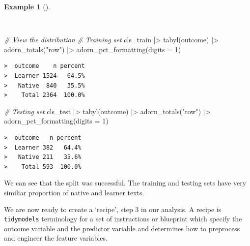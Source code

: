 \documentclass[
  letterpaper,
]{latex/krantz}
\newenvironment{Shaded}{\begin{snugshade}}{\end{snugshade}}
\newcommand{\AttributeTok}[1]{\textcolor[rgb]{0.00,0.00,0.00}{#1}}
\newcommand{\CommentTok}[1]{\textcolor[rgb]{0.00,0.00,0.00}{\textit{#1}}}
\newcommand{\DecValTok}[1]{\textcolor[rgb]{0.00,0.00,0.00}{#1}}
\newcommand{\FunctionTok}[1]{\textcolor[rgb]{0.00,0.00,0.00}{#1}}
\newcommand{\NormalTok}[1]{\textcolor[rgb]{0.00,0.00,0.00}{#1}}
\newcommand{\SpecialCharTok}[1]{\textcolor[rgb]{0.00,0.00,0.00}{#1}}
\newcommand{\StringTok}[1]{\textcolor[rgb]{0.00,0.00,0.00}{#1}}
\theoremstyle{definition}
\newtheorem{example}{Example}[chapter]
\theoremstyle{remark}
\begin{document}
\begin{example}[]\protect\hypertarget{exm-pda-class-split-tabyl}{}\label{exm-pda-class-split-tabyl}

~

\begin{Shaded}
\begin{Highlighting}[]
\CommentTok{\# View the distribution}
\CommentTok{\# Training set}
\NormalTok{cls\_train }\SpecialCharTok{|\textgreater{}}
  \FunctionTok{tabyl}\NormalTok{(outcome) }\SpecialCharTok{|\textgreater{}}
  \FunctionTok{adorn\_totals}\NormalTok{(}\StringTok{"row"}\NormalTok{) }\SpecialCharTok{|\textgreater{}}
  \FunctionTok{adorn\_pct\_formatting}\NormalTok{(}\AttributeTok{digits =} \DecValTok{1}\NormalTok{)}
\end{Highlighting}
\end{Shaded}

\begin{verbatim}
>  outcome    n percent
>  Learner 1524   64.5%
>   Native  840   35.5%
>    Total 2364  100.0%
\end{verbatim}

\begin{Shaded}
\begin{Highlighting}[]
\CommentTok{\# Testing set}
\NormalTok{cls\_test }\SpecialCharTok{|\textgreater{}}
  \FunctionTok{tabyl}\NormalTok{(outcome) }\SpecialCharTok{|\textgreater{}}
  \FunctionTok{adorn\_totals}\NormalTok{(}\StringTok{"row"}\NormalTok{) }\SpecialCharTok{|\textgreater{}}
  \FunctionTok{adorn\_pct\_formatting}\NormalTok{(}\AttributeTok{digits =} \DecValTok{1}\NormalTok{)}
\end{Highlighting}
\end{Shaded}

\begin{verbatim}
>  outcome   n percent
>  Learner 382   64.4%
>   Native 211   35.6%
>    Total 593  100.0%
\end{verbatim}

\end{example}

We can see that the split was successful. The training and testing sets
have very similiar proportion of native and learner texts.

We are now ready to create a `recipe', step 3 in our analysis. A recipe
is \texttt{tidymodels} terminology for a set of instructions or
blueprint which specify the outcome variable and the predictor variable
and determines how to preprocess and engineer the feature variables.
\end{document}
